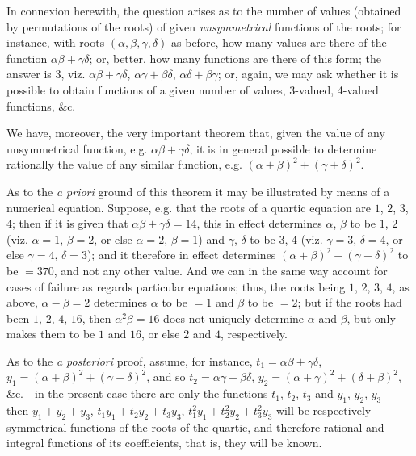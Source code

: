 \documentclass[11pt,a4paper]{book}
\begin{document}
In connexion herewith, the question arises as to the number of values (obtained by permutations of the roots) of given \textit{unsymmetrical} functions of the roots; for instance, with roots $(\alpha, \beta, \gamma, \delta)$ as before, how many values are there of the function $\alpha\beta + \gamma\delta$; or, better, how many functions are there of this form; the answer is 3, viz. $\alpha\beta + \gamma\delta$, $\alpha\gamma + \beta\delta$, $\alpha\delta + \beta\gamma$; or, again, we may ask whether it is possible to obtain functions of a given number of values, 3-valued, 4-valued functions, \&c.

We have, moreover, the very important theorem that, given the value of any unsymmetrical function, e.g. $\alpha\beta + \gamma\delta$, it is in general possible to determine rationally the value of any similar function, e.g. $(\alpha + \beta)^2 + (\gamma + \delta)^2$.

As to the \textit{a priori} ground of this theorem it may be illustrated by means of a numerical equation. Suppose, e.g. that the roots of a quartic equation are $1$, $2$, $3$, $4$; then if it is given that $\alpha\beta + \gamma\delta = 14$, this in effect determines $\alpha$, $\beta$ to be $1$, $2$ (viz. $\alpha = 1$, $\beta = 2$, or else $\alpha = 2$, $\beta = 1$) and $\gamma$, $\delta$ to be $3$, $4$ (viz. $\gamma = 3$, $\delta = 4$, or else $\gamma = 4$, $\delta = 3$); and it therefore in effect determines $(\alpha + \beta)^2 + (\gamma + \delta)^2$ to be $= 370$, and not any other value. And we can in the same way account for cases of failure as regards particular equations; thus, the roots being $1$, $2$, $3$, $4$, as above, $\alpha - \beta = 2$ determines $\alpha$ to be $= 1$ and $\beta$ to be $= 2$; but if the roots had been $1$, $2$, $4$, $16$, then $\alpha^2\beta = 16$ does not uniquely determine $\alpha$ and $\beta$, but only makes them to be $1$ and $16$, or else $2$ and $4$, respectively.

As to the \textit{a posteriori} proof, assume, for instance, $t_1 = \alpha\beta + \gamma\delta$, $y_1 = (\alpha + \beta)^2 + (\gamma + \delta)^2$, and so $t_2 = \alpha\gamma + \beta\delta$, $y_2 = (\alpha + \gamma)^2 + (\delta + \beta)^2$, \&c.---in the present case there are only the functions $t_1$, $t_2$, $t_3$ and $y_1$, $y_2$, $y_3$---then $y_1 + y_2 + y_3$, $t_1 y_1 + t_2 y_2 + t_3 y_3$, $t_1^2 y_1 + t_2^2 y_2 + t_3^2 y_3$ will be respectively symmetrical functions of the roots of the quartic, and therefore rational and integral functions of its coefficients, that is, they will be known.
\end{document}
